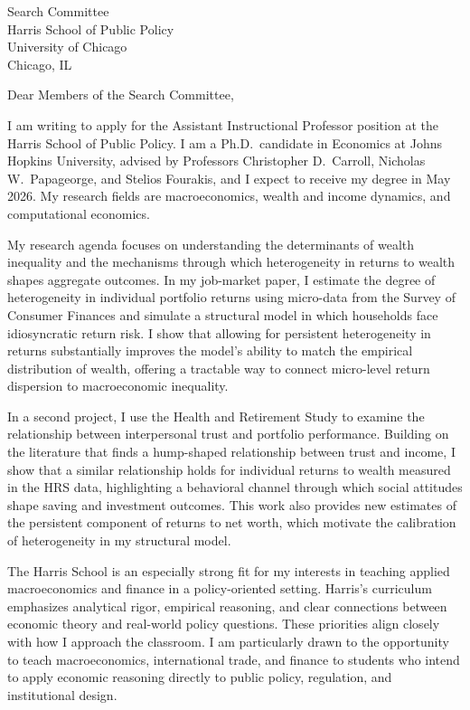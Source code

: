 \documentclass[11pt,letterpaper]{letter}
\begin{document}
\begin{letter}{Search Committee \\
Harris School of Public Policy \\
University of Chicago \\
Chicago, IL}

\opening{Dear Members of the Search Committee,}

I am writing to apply for the Assistant Instructional Professor position at the Harris School of Public Policy. I am a Ph.D.\ candidate in Economics at Johns Hopkins University, advised by Professors Christopher D.~Carroll, Nicholas W.~Papageorge, and Stelios Fourakis, and I expect to receive my degree in May 2026. My research fields are macroeconomics, wealth and income dynamics, and computational economics.

My research agenda focuses on understanding the determinants of wealth inequality and the mechanisms through which heterogeneity in returns to wealth shapes aggregate outcomes. In my job-market paper, I estimate the degree of heterogeneity in individual portfolio returns using micro-data from the Survey of Consumer Finances and simulate a structural model in which households face idiosyncratic return risk. I show that allowing for persistent heterogeneity in returns substantially improves the model’s ability to match the empirical distribution of wealth, offering a tractable way to connect micro-level return dispersion to macroeconomic inequality.

In a second project, I use the Health and Retirement Study to examine the relationship between interpersonal trust and portfolio performance. Building on the literature that finds a hump-shaped relationship between trust and income, I show that a similar relationship holds for individual returns to wealth measured in the HRS data, highlighting a behavioral channel through which social attitudes shape saving and investment outcomes. This work also provides new estimates of the persistent component of returns to net worth, which motivate the calibration of heterogeneity in my structural model.

The Harris School is an especially strong fit for my interests in teaching applied macroeconomics and finance in a policy-oriented setting. Harris’s curriculum emphasizes analytical rigor, empirical reasoning, and clear connections between economic theory and real-world policy questions. These priorities align closely with how I approach the classroom. I am particularly drawn to the opportunity to teach macroeconomics, international trade, and finance to students who intend to apply economic reasoning directly to public policy, regulation, and institutional design.


\end{letter}
\end{document}
